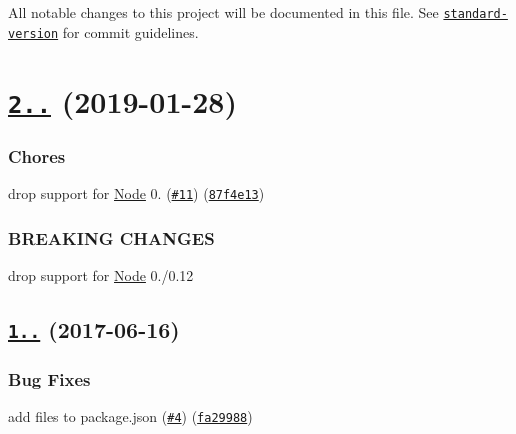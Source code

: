 All notable changes to this project will be documented in this file. See \href{https://github.com/conventional-changelog/standard-version}{\tt standard-\/version} for commit guidelines.

\label{_2.0.0}%
 \section*{\href{https://github.com/yargs/require-main-filename/compare/v1.0.2...v2.0.0}{\tt 2..} (2019-\/01-\/28)}

\subsubsection*{Chores}


\begin{DoxyItemize}
\item drop support for \mbox{\hyperlink{classNode}{Node}} 0. (\href{https://github.com/yargs/require-main-filename/issues/11}{\tt \#11}) (\href{https://github.com/yargs/require-main-filename/commit/87f4e13}{\tt 87f4e13})
\end{DoxyItemize}

\subsubsection*{B\+R\+E\+A\+K\+I\+NG C\+H\+A\+N\+G\+ES}


\begin{DoxyItemize}
\item drop support for \mbox{\hyperlink{classNode}{Node}} 0./0.12
\end{DoxyItemize}

\label{_1.0.2}%
 \subsection*{\href{https://github.com/yargs/require-main-filename/compare/v1.0.1...v1.0.2}{\tt 1..} (2017-\/06-\/16)}

\subsubsection*{Bug Fixes}


\begin{DoxyItemize}
\item add files to package.\+json (\href{https://github.com/yargs/require-main-filename/issues/4}{\tt \#4}) (\href{https://github.com/yargs/require-main-filename/commit/fa29988}{\tt fa29988}) 
\end{DoxyItemize}
